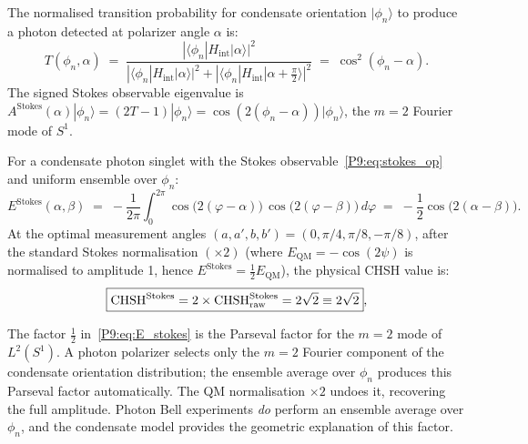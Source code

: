 \begin{theorem}
\label{P9:thm:malus}
The normalised transition probability for condensate orientation $|\phi_n\rangle$
to produce a photon detected at polarizer angle $\alpha$ is:
\begin{equation}
  T(\phi_n,\alpha)
  \;=\; \frac{|\langle\phi_n|H_\mathrm{int}|\alpha\rangle|^2}
             {|\langle\phi_n|H_\mathrm{int}|\alpha\rangle|^2
              +|\langle\phi_n|H_\mathrm{int}|\alpha{+}\tfrac{\pi}{2}\rangle|^2}
  \;=\; \cos^2(\phi_n-\alpha).
  \label{P9:eq:malus_derived}
\end{equation}
The signed Stokes observable eigenvalue is
$A^\mathrm{Stokes}(\alpha)|\phi_n\rangle = (2T-1)|\phi_n\rangle
= \cos(2(\phi_n-\alpha))|\phi_n\rangle$,
the $m=2$ Fourier mode of $S^1$.
\end{theorem}

\begin{theorem}
\label{P9:thm:stokes}
For a condensate photon singlet with the Stokes observable~\eqref{P9:eq:stokes_op} and uniform ensemble over $\phi_n$:
\begin{equation}
  E^\mathrm{Stokes}(\alpha,\beta)
  \;=\; -\frac{1}{2\pi}\int_0^{2\pi}
  \cos\bigl(2(\varphi-\alpha)\bigr)\,\cos\bigl(2(\varphi-\beta)\bigr)\,d\varphi
  \;=\; -\frac{1}{2}\cos\bigl(2(\alpha-\beta)\bigr).
  \label{P9:eq:E_stokes}
\end{equation}
At the optimal measurement angles $(a,a',b,b')=(0,\pi/4,\pi/8,-\pi/8)$,
after the standard Stokes normalisation $(\times2)$ (where $E_\mathrm{QM}=-\cos(2\psi)$
is normalised to amplitude 1, hence $E^\mathrm{Stokes} = \tfrac{1}{2}E_\mathrm{QM}$),
the physical CHSH value is:
\begin{equation}
  \boxed{\mathrm{CHSH}^\mathrm{Stokes}
  = 2\times\mathrm{CHSH}^\mathrm{Stokes}_\mathrm{raw}
  = 2\sqrt{2}
  \equiv 2\sqrt{2}},
  \label{P9:eq:stokes_tsirelson}
\end{equation}
\end{theorem}

\begin{remark}
\label{P9:rem:parseval_averaging}
The factor $\tfrac{1}{2}$ in~\eqref{P9:eq:E_stokes} is the Parseval factor
for the $m=2$ mode of $L^2(S^1)$.
A photon polarizer selects only the $m=2$ Fourier component of the condensate
orientation distribution; the ensemble average over $\phi_n$ produces this
Parseval factor automatically.
The QM normalisation $\times2$ undoes it, recovering the full amplitude.
Photon Bell experiments \emph{do} perform an ensemble average over $\phi_n$,
and the condensate model provides the geometric explanation of this factor.
\end{remark}

